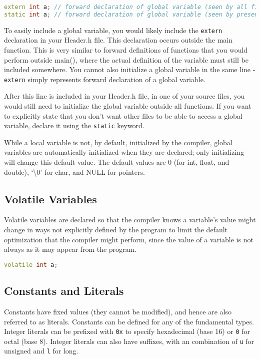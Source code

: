 \documentclass[10pt]{article}
\begin{document}
\begin{lstlisting}[language=C++]
extern int a; // forward declaration of global variable (seen by all files)
static int a; // forward declaration of global variable (seen by present file)
\end{lstlisting}

To easily include a global variable, you would likely include the \texttt{extern} declaration in your Header.h file. This declaration occurs outside the main function. This is very similar to forward definitions of functions that you would perform outside main(), where the actual definition of the variable must still be included somewhere. You cannot also initialize a global variable in the same line - \texttt{extern} simply represents forward declaration of a global variable.

After this line is included in your Header.h file, in one of your source files, you would still need to initialize the global variable outside all functions. If you want to explicitly state that you don't want other files to be able to access a global variable, declare it using the \texttt{static} keyword.

While a local variable is not, by default, initialized by the compiler, global variables are automatically initialized when they are declared; only initializing will change this default value. The default values are 0 (for int, float, and double), `\textbackslash 0' for char, and NULL for pointers.

\subsection{Volatile Variables}

Volatile variables are declared so that the compiler knows a variable's value might change in ways not explicitly defined by the program to limit the default optimization that the compiler might perform, since the value of a variable is not always as it may appear from the program.

\begin{lstlisting}[language=C++]
volatile int a;
\end{lstlisting}

\subsection{Constants and Literals}

Constants have fixed values (they cannot be modified), and hence are also referred to as literals. Constants can be defined for any of the fundamental types. Integer literals can be prefixed with \texttt{0x} to specify hexadecimal (base 16) or \texttt{0} for octal (base 8). Integer literals can also have suffixes, with an combination of \texttt{u} for unsigned and \texttt{l} for long.
\end{document}

